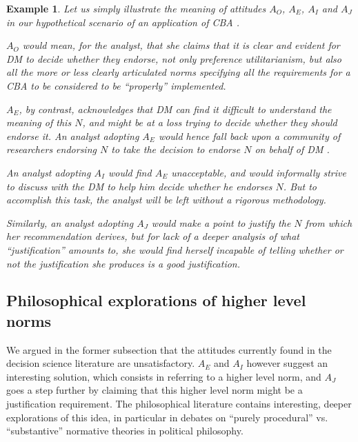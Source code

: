 \documentclass[preprint, french, english, 11pt, authoryear]{elsarticle}%
\newtheorem{example}{Example}
\begin{document}
\begin{example}
Let us simply illustrate the meaning of attitudes $A_O$, $A_E$, $A_I$ and $A_J$ in our hypothetical scenario of an application of CBA%
.

$A_O$ would mean, for the analyst, that she claims that it is clear and evident for DM%
 to decide whether they endorse, not only preference utilitarianism, but also all the more or less clearly articulated norms specifying all the requirements for a CBA%
  to be considered to be ``properly'' implemented.

$A_E$, by contrast, acknowledges that DM%
 can find it difficult to understand the meaning of this $N$, and might be at a loss trying to decide whether they should endorse it. 
An analyst adopting $A_E$ would hence fall back upon a community of researchers endorsing $N$ to take the decision to endorse $N$ on behalf of DM%
.

An analyst adopting $A_I$ would find $A_E$ unacceptable, and would informally strive to discuss with the DM%
 to help him decide whether he endorses $N$. But to accomplish this task, the analyst will be left without a rigorous methodology.

Similarly, an analyst adopting $A_J$ would make a point to justify the $N$ from which her recommendation derives, but for lack of a deeper analysis of what ``justification'' amounts to, she would find herself incapable of telling whether or not the justification she produces is a good justification.

\end{example}

\subsection{Philosophical explorations of higher level norms}
\label{sec:higher}
We argued in the former subsection that the attitudes currently found in the decision science literature are unsatisfactory. 
$A_E$ and $A_I$ however suggest an interesting solution, which consists in referring to a higher level norm, and $A_J$ goes a step further by claiming that this higher level norm might be a justification requirement.
The philosophical literature contains interesting, deeper explorations of this idea, in particular in debates on “purely procedural” vs. “substantive” normative theories in political philosophy.
\end{document}
